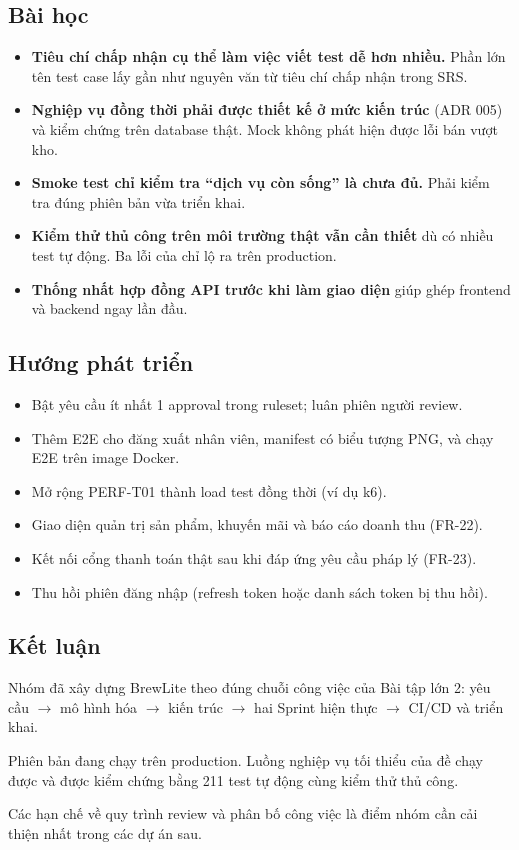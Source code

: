\subsection{Bài học}
\begin{itemize}
\item \textbf{Tiêu chí chấp nhận cụ thể làm việc viết test dễ hơn nhiều.} Phần lớn tên test case lấy gần như nguyên văn từ tiêu chí chấp nhận trong SRS.
\item \textbf{Nghiệp vụ đồng thời phải được thiết kế ở mức kiến trúc} (ADR 005) và kiểm chứng trên database thật. Mock không phát hiện được lỗi bán vượt kho.
\item \textbf{Smoke test chỉ kiểm tra ``dịch vụ còn sống'' là chưa đủ.} Phải kiểm tra đúng phiên bản vừa triển khai.
\item \textbf{Kiểm thử thủ công trên môi trường thật vẫn cần thiết} dù có nhiều test tự động. Ba lỗi của  chỉ lộ ra trên production.
\item \textbf{Thống nhất hợp đồng API trước khi làm giao diện} giúp ghép frontend và backend ngay lần đầu.
\end{itemize}

\subsection{Hướng phát triển}
\begin{itemize}
\item Bật yêu cầu ít nhất 1 approval trong ruleset; luân phiên người review.
\item Thêm E2E cho đăng xuất nhân viên, manifest có biểu tượng PNG, và chạy E2E trên image Docker.
\item Mở rộng PERF-T01 thành load test đồng thời (ví dụ k6).
\item Giao diện quản trị sản phẩm, khuyến mãi và báo cáo doanh thu (FR-22).
\item Kết nối cổng thanh toán thật sau khi đáp ứng yêu cầu pháp lý (FR-23).
\item Thu hồi phiên đăng nhập (refresh token hoặc danh sách token bị thu hồi).
\end{itemize}

\subsection{Kết luận}
Nhóm đã xây dựng BrewLite theo đúng chuỗi công việc của Bài tập lớn 2: yêu cầu $\rightarrow$ mô hình hóa $\rightarrow$ kiến trúc $\rightarrow$ hai Sprint hiện thực $\rightarrow$ CI/CD và triển khai.

Phiên bản  đang chạy trên production. Luồng nghiệp vụ tối thiểu của đề chạy được và được kiểm chứng bằng 211 test tự động cùng kiểm thử thủ công.

Các hạn chế về quy trình review và phân bố công việc là điểm nhóm cần cải thiện nhất trong các dự án sau.

\bigskip
